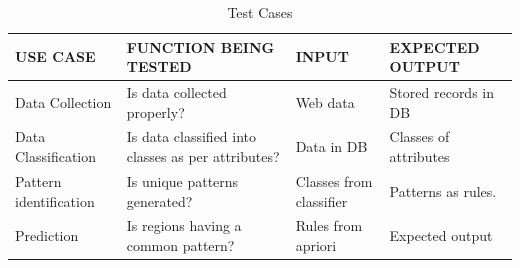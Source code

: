 \begin{itemize}
\end{itemize}

\begin{table}[ht]

\begin{tabular}{ |M{4cm}|p{5cm}|M{2.5cm}|M{3.2cm}|  }
 \hline
 \textbf{USE CASE} & \textbf{FUNCTION BEING TESTED} & \textbf{INPUT} & \textbf{EXPECTED OUTPUT}\\
 \hline
 
Data Collection & Is data collected properly? & Web data & Stored records in DB\\

\hline
 Data Classification & Is data classified into  classes as per attributes? & Data in DB & Classes of attributes\\
 
 \hline
 Pattern identification & Is unique patterns generated? & Classes from classifier & Patterns as rules.\\
 
 \hline
 Prediction & Is regions having a common pattern? & Rules from apriori & Expected output\\
  
  \hline
  
 
 \end{tabular}
 \begin{center}
 \caption{Test Cases}
 \end{center}
 \end{table}